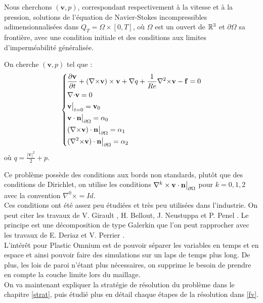 Nous cherchons $(\mathbf{v},p)$, correspondant respectivement à la vitesse et à la pression, solutions de l'équation de Navier-Stokes incompressibles adimensionnalisées dans $Q_T=\Omega\times[0,T]$, où $\Omega$ est un ouvert de ${\mathbb{R}}^3$ et $\partial\Omega$ sa frontière, avec une condition initiale et des conditions aux limites d'imperméabilité généralisée.
\begin{pb}\label{depart}
On cherche $(\mathbf{v},p)$ tel que :
\begin{equation*}
\left\{\begin{aligned}
&\frac{\partial \mathbf{v}}{\partial t} + ({\nabla\times}  \mathbf{v})\times \mathbf{v} + {\nabla} q + \frac{1}{Re}{\nabla^2\times}  \mathbf{v}-\mathbf{f} = 0\\
&{\nabla\cdot} \mathbf{v} = 0\\
&\mathbf{v}\big\rvert_{t=0} = \mathbf{v}_0\\
&\mathbf{v}\cdot \mathbf{n}{\big\rvert_{\partial\Omega}} = \alpha_0\\
&({\nabla\times}  \mathbf{v})\cdot \mathbf{n}{\big\rvert_{\partial\Omega}} = \alpha_1\\
&({\nabla^2\times}  \mathbf{v})\cdot \mathbf{n}{\big\rvert_{\partial\Omega}} = \alpha_2
\end{aligned}\right.
\end{equation*}
où $q = \frac{|\mathbf{v}|^2}{2}+p$.\\
\end{pb}
Ce problème possède des conditions aux bords non standards, plutôt que des conditions de Dirichlet, on utilise les conditions $\nabla^k\times\mathbf{v}\cdot\mathbf{n}{\big\rvert_{\partial\Omega}}$ pour $k=0,1,2$ avec la convention $\nabla^0\times=Id$.\\
Ces conditions ont été assez peu étudiées et très peu utilisées dans l'industrie. On peut citer les travaux de V. Girault \cite{girault90-1}, H. Bellout, J. Neustuppa et P. Penel \cite{Penel2004}. Le principe est une décomposition de type Galerkin que l'on peut rapprocher avec les travaux de E. Deriaz et V. Perrier \cite{Deriaz2009249}.\\

L'intérêt pour Plastic Omnium est de pouvoir séparer les variables en temps et en espace et ainsi pouvoir faire des simulations sur un laps de temps plus long. De plus, les lois de paroi n'étant plus nécessaires, on supprime le besoin de prendre en compte la couche limite lors du maillage.\\

On va maintenant expliquer la stratégie de résolution du problème dans le chapitre \ref{strat}, puis étudié plus en détail chaque étapes de la résolution dans \ref{fv}.

